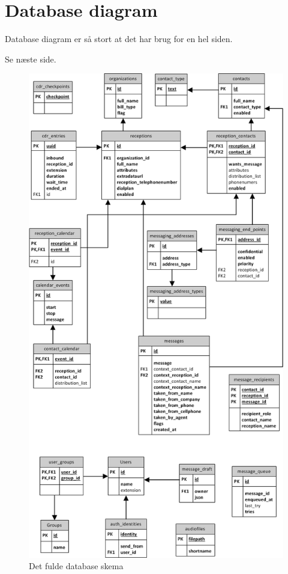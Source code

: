 \chapter{Database diagram}
Database diagram er så stort at det har brug for en hel siden. 

Se næste side.
\begin{figure}[ht!]
\centering
\includegraphics[height=\textheight]{images/ER_Full.png}
\caption{Det fulde database skema}
\label{fig:erfull}
\end{figure}
